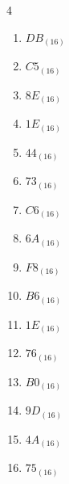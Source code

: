 \begin{multicols}{4}
\begin{enumerate}
  \item $DB_{(16)}$

        \phantom{$=219$}

  \item $C5_{(16)}$

        \phantom{$=197$}

  \item $8E_{(16)}$

        \phantom{$=142$}

  \item $1E_{(16)}$

        \phantom{$=30$}

  \item $44_{(16)}$

        \phantom{$=68$}

  \item $73_{(16)}$

        \phantom{$=115$}

  \item $C6_{(16)}$

        \phantom{$=198$}

  \item $6A_{(16)}$

        \phantom{$=106$}

  \item $F8_{(16)}$

        \phantom{$=248$}

  \item $B6_{(16)}$

        \phantom{$=182$}

  \item $1E_{(16)}$

        \phantom{$=30$}

  \item $76_{(16)}$

        \phantom{$=118$}

  \item $B0_{(16)}$

        \phantom{$=176$}

  \item $9D_{(16)}$

        \phantom{$=157$}

\columnbreak %

  \item $4A_{(16)}$

        \phantom{$=74$}

  \item $75_{(16)}$


\end{enumerate}
\end{multicols}

